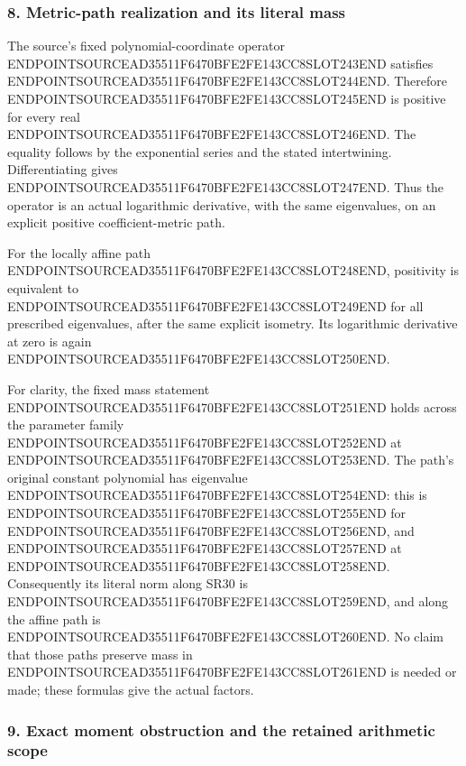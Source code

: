 \subsubsection{8. Metric-path realization and its literal mass}\label{endpoint-four_window_sharpness_review--metric-path-realization-and-its-literal-mass}

The source's fixed polynomial-coordinate operator ENDPOINTSOURCEAD35511F6470BFE2FE143CC8SLOT243END satisfies ENDPOINTSOURCEAD35511F6470BFE2FE143CC8SLOT244END. Therefore ENDPOINTSOURCEAD35511F6470BFE2FE143CC8SLOT245END is positive for every real ENDPOINTSOURCEAD35511F6470BFE2FE143CC8SLOT246END. The equality follows by the exponential series and the stated intertwining. Differentiating gives ENDPOINTSOURCEAD35511F6470BFE2FE143CC8SLOT247END. Thus the operator is an actual logarithmic derivative, with the same eigenvalues, on an explicit positive coefficient-metric path.

For the locally affine path ENDPOINTSOURCEAD35511F6470BFE2FE143CC8SLOT248END, positivity is equivalent to ENDPOINTSOURCEAD35511F6470BFE2FE143CC8SLOT249END for all prescribed eigenvalues, after the same explicit isometry. Its logarithmic derivative at zero is again ENDPOINTSOURCEAD35511F6470BFE2FE143CC8SLOT250END.

For clarity, the fixed mass statement ENDPOINTSOURCEAD35511F6470BFE2FE143CC8SLOT251END holds across the parameter family ENDPOINTSOURCEAD35511F6470BFE2FE143CC8SLOT252END at ENDPOINTSOURCEAD35511F6470BFE2FE143CC8SLOT253END. The path's original constant polynomial has eigenvalue ENDPOINTSOURCEAD35511F6470BFE2FE143CC8SLOT254END: this is ENDPOINTSOURCEAD35511F6470BFE2FE143CC8SLOT255END for ENDPOINTSOURCEAD35511F6470BFE2FE143CC8SLOT256END, and ENDPOINTSOURCEAD35511F6470BFE2FE143CC8SLOT257END at ENDPOINTSOURCEAD35511F6470BFE2FE143CC8SLOT258END. Consequently its literal norm along SR30 is ENDPOINTSOURCEAD35511F6470BFE2FE143CC8SLOT259END, and along the affine path is ENDPOINTSOURCEAD35511F6470BFE2FE143CC8SLOT260END. No claim that those paths preserve mass in ENDPOINTSOURCEAD35511F6470BFE2FE143CC8SLOT261END is needed or made; these formulas give the actual factors.

\subsubsection{9. Exact moment obstruction and the retained arithmetic scope}\label{endpoint-four_window_sharpness_review--exact-moment-obstruction-and-the-retained-arithmetic-scope}

